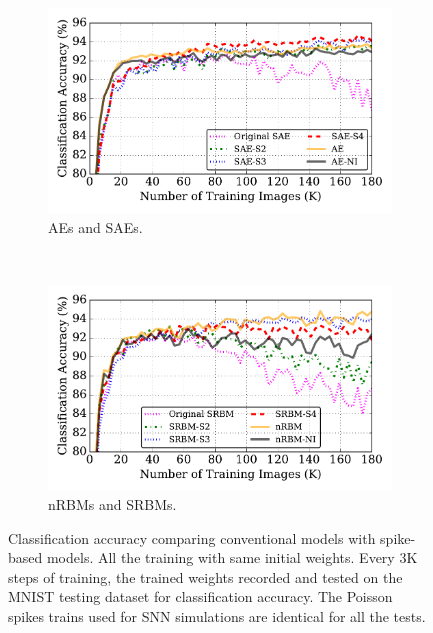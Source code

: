 \begin{figure}
	\centering
	\begin{subfigure}[t]{0.8\textwidth}
		\includegraphics[width=\textwidth]{pics_sdlm/43_MNIST_SAE_all/compare_result.pdf}
		\caption{AEs and SAEs.}
	\end{subfigure}\\
	\begin{subfigure}[t]{0.8\textwidth}
		\includegraphics[width=\textwidth]{pics_sdlm/53_MNIST_SRBM_all/compare_result.pdf}
		\caption{nRBMs and SRBMs.}
	\end{subfigure}
	\DIFdelbeginFL %
\DIFdelendFL \DIFaddbeginFL \caption[Classification accuracy comparisons of conventional models with spike-based models.]{\DIFaddendFL Classification accuracy comparing conventional models with spike-based models. All the training \DIFdelbeginFL {}\DIFdelendFL \DIFaddbeginFL {}\DIFaddendFL with \DIFaddbeginFL {}\DIFaddendFL same initial weights. Every 3K steps of training, the trained weights \DIFdelbeginFL {}\DIFdelendFL \DIFaddbeginFL {}\DIFaddendFL recorded and tested on the MNIST testing dataset for classification accuracy. The Poisson spikes trains used for SNN simulations are identical for all the tests.}
	\label{fig:sdlm_ca}
\end{figure}
\DIFdelbegin {}%
\DIFdelend \DIFaddbegin 

